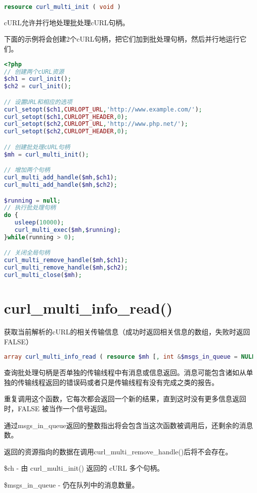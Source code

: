 \begin{lstlisting}[language=PHP]
resource curl_multi_init ( void )
\end{lstlisting}

cURL允许并行地处理批处理cURL句柄。

下面的示例将会创建2个cURL句柄，把它们加到批处理句柄，然后并行地运行它们。

\begin{lstlisting}[language=PHP]
<?php
// 创建两个cURL资源
$ch1 = curl_init();
$ch2 = curl_init();

// 设置URL和相应的选项
curl_setopt($ch1,CURLOPT_URL,'http://www.example.com/');
curl_setopt($ch1,CURLOPT_HEADER,0);
curl_setopt($ch2,CURLOPT_URL,'http://www.php.net/');
curl_setopt($ch2,CURLOPT_HEADER,0);

// 创建批处理cURL句柄
$mh = curl_multi_init();

// 增加两个句柄
curl_multi_add_handle($mh,$ch1);
curl_multi_add_handle($mh,$ch2);

$running = null;
// 执行批处理句柄
do {
   usleep(10000);
   curl_multi_exec($mh,$running);
}while(running > 0);

// 关闭全局句柄
curl_multi_remove_handle($mh,$ch1);
curl_multi_remove_handle($mh,$ch2);
curl_multi_close($mh);
\end{lstlisting}

\section{curl\_multi\_info\_read()}

获取当前解析的cURL的相关传输信息（成功时返回相关信息的数组，失败时返回FALSE）

\begin{lstlisting}[language=PHP]
array curl_multi_info_read ( resource $mh [, int &$msgs_in_queue = NULL ] )
\end{lstlisting}

查询批处理句柄是否单独的传输线程中有消息或信息返回。消息可能包含诸如从单独的传输线程返回的错误码或者只是传输线程有没有完成之类的报告。

重复调用这个函数，它每次都会返回一个新的结果，直到这时没有更多信息返回时，FALSE 被当作一个信号返回。

通过msgs\_in\_queue返回的整数指出将会包含当这次函数被调用后，还剩余的消息数。

返回的资源指向的数据在调用curl\_multi\_remove\_handle()后将不会存在。

\begin{compactitem}
\item \$ch - 由 curl\_multi\_init() 返回的 cURL 多个句柄。
\item \$msgs\_in\_queue - 仍在队列中的消息数量。
\end{compactitem}

